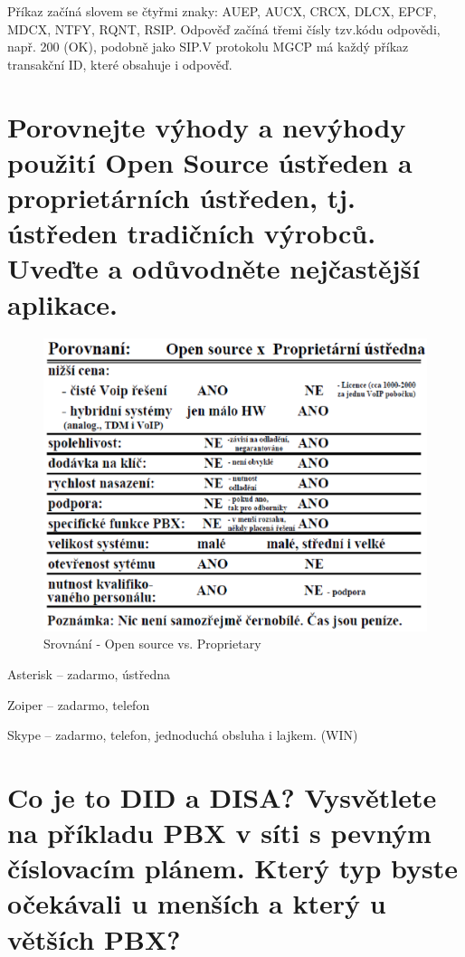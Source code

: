 Příkaz začíná slovem se čtyřmi znaky: AUEP, AUCX, CRCX, DLCX, EPCF, MDCX, NTFY, RQNT, RSIP.\@
Odpověď začíná třemi čísly tzv.\@ kódu odpovědi, např. 200 (OK), podobně jako SIP.\@ V protokolu MGCP má každý příkaz transakční ID, které obsahuje i odpověď.


\newpage

\section{Porovnejte výhody a nevýhody použití Open Source ústředen a proprietárních ústředen, tj. ústředen tradičních výrobců. Uveďte a odůvodněte nejčastější aplikace.}

\begin{figure}[h!]
    \begin{center}
        \includegraphics[width=\textwidth]{images/otazka3.png}
        \caption{Srovnání - Open source vs. Proprietary}
        \label{img:1}
    \end{center}
\end{figure}

\noindent Asterisk -- zadarmo, ústředna

\noindent Zoiper -- zadarmo, telefon

\noindent Skype -- zadarmo, telefon, jednoduchá obsluha i lajkem. (WIN)


\newpage

\section{Co je to DID a DISA? Vysvětlete na příkladu PBX v síti s pevným číslovacím plánem. Který typ byste očekávali u menších a který u větších PBX?}

